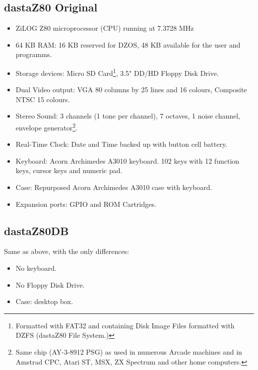 \documentclass[a4paper,11pt]{article}
\begin{document}
    \subsection{dastaZ80 Original}

    \begin{itemize}
        \item ZiLOG Z80 microprocessor (CPU) running at 7.3728 MHz
        \item 64 KB RAM: 16 KB reserved for DZOS, 48 KB available
            for the user and programms.
        \item Storage devices: Micro SD Card\footnote{Formatted with FAT32 and
            containing Disk Image Files formatted with DZFS (dastaZ80 File
            System.)}, 3.5" DD/HD Floppy Disk Drive.
        \item Dual Video output: VGA 80 columns by 25 lines and 16 colours,
            Composite NTSC 15 colours.
        \item Stereo Sound: 3 channels (1 tone per channel), 7 octaves, 1 noise
            channel, envelope generator\footnote{Same chip (AY-3-8912 PSG) as
            used in numerous Arcade machines and in Amstrad CPC, Atari ST, MSX,
            ZX Spectrum and other home computers.}.
        \item Real-Time Clock: Date and Time backed up with button cell battery.
        \item Keyboard: Acorn Archimedes A3010 keyboard. 102 keys with 12 function
            keys, cursor keys and numeric pad.
        \item Case: Repurposed Acorn Archimedes A3010 case with keyboard.
        \item Expansion ports: GPIO and ROM Cartridges.
    \end{itemize}

    \subsection{dastaZ80DB}

    Same as above, with the only differences:

    \begin{itemize}
        \item No keyboard.
        \item No Floppy Disk Drive.
        \item Case: desktop box.
    \end{itemize}
\end{document}
